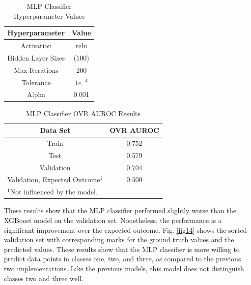 \documentclass[conference]{IEEEtran}
\begin{document}
\begin{table}[htbp]
\caption{MLP Classifier Hyperparameter Values}
\begin{center}
\begin{tabular}{|c||c|}
\hline
\textbf{Hyperparameter} & \textbf{Value} \\
\hline
\hline
Activation & relu \\
\hline
Hidden Layer Sizes & (100) \\
\hline
Max Iterations & 200 \\
\hline
Tolerance & $1e^{-4}$ \\
\hline
Alpha & 0.001 \\
\hline
\end{tabular}
\label{tab13}
\end{center}
\end{table}

\begin{table}[htbp]
\caption{MLP Classifier OVR AUROC Results}
\begin{center}
\begin{tabular}{|c||c|}
\hline
\textbf{Data Set} & \textbf{OVR AUROC} \\
\hline
\hline
Train & 0.752 \\
\hline
Test & 0.579 \\
\hline
Validation & 0.704 \\
\hline
Validation, Expected Outcome$^{\mathrm{1}}$ & 0.500 \\
\hline
\multicolumn{2}{l}{$^{\mathrm{1}}$Not influenced by the model.}
\end{tabular}
\label{tab14}
\end{center}
\end{table}

These results show that the MLP classifier performed slightly worse than the XGBoost model on the validation set. Nonetheless, the performance is a significant improvement over the expected outcome. Fig. \ref{fig14} shows the sorted validation set with corresponding marks for the ground truth values and the predicted values. These results show that the MLP classifier is more willing to predict data points in classes one, two, and three, as compared to the previous two implementations. Like the previous models, this model does not distinguish classes two and three well. 
\end{document}
